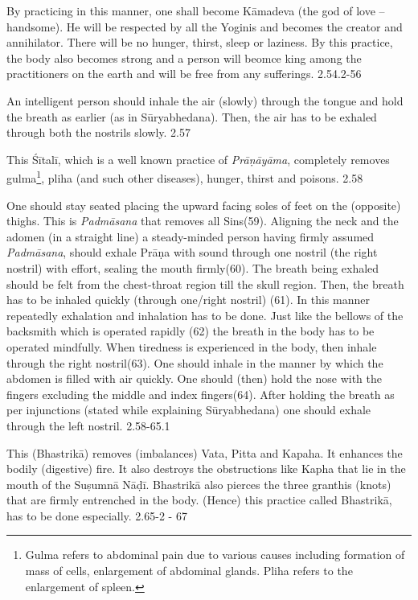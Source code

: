 
By practicing in this manner, one shall become Kāmadeva (the god of love – handsome). He will be respected by all the Yoginis and becomes the creator and annihilator. There will be no hunger, thirst, sleep or laziness. By this practice, the body also becomes strong and a person will beomce king among the practitioners on the earth and will be free from any sufferings.   2.54.2-56


An intelligent person should inhale the air (slowly) through the tongue and hold the breath as earlier (as in Sūryabhedana). Then, the air has to be exhaled through both the nostrils slowly.  2.57


This Śītalī, which is a well known practice of \textit{Prāṇāyāma}, completely removes gulma\footnote{Gulma refers to abdominal pain due to various causes including formation of mass of cells, enlargement of abdominal glands. Pliha refers to the enlargement of spleen.}, pliha (and such other diseases), hunger, thirst and poisons.  2.58


One should stay seated placing the upward facing soles of feet on the (opposite) thighs. This is \textit{Padmāsana} that removes all Sins(59). Aligning the neck and the adomen (in a straight line) a steady-minded person having firmly assumed \textit{Padmāsana}, should exhale Prāṇa with sound through one nostril (the right nostril) with effort, sealing the mouth firmly(60). The breath being exhaled should be felt from the chest-throat region till the skull region. Then, the breath has to be inhaled quickly (through one/right nostril) (61). In this manner repeatedly exhalation and inhalation has to be done. Just like the bellows of the backsmith which is operated rapidly (62) the breath in the body has to be operated mindfully. When tiredness is experienced in the body, then inhale through the right nostril(63). One should inhale in the manner by which the abdomen is filled with air quickly. One should (then) hold the nose with the fingers excluding the middle and index fingers(64). After holding the breath as per injunctions (stated while explaining Sūryabhedana) one should exhale through the left nostril. 2.58-65.1


This (Bhastrikā) removes (imbalances) Vata, Pitta and Kapaha. It enhances the bodily (digestive) fire. It also destroys the obstructions like Kapha that lie in the mouth of the Suṣumnā Nāḍī. Bhastrikā also pierces the three granthis (knots) that are firmly entrenched in the body. (Hence) this practice called Bhastrikā, has to be done especially. 2.65-2 - 67

